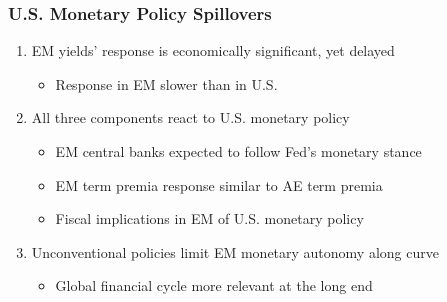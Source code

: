 \documentclass[12pt, aspectratio=169, xcolor=dvipsnames]{beamer}
\title{}
\date{}
\author{Pavel Solís}
\institute{Johns Hopkins University}
\begin{document}
	
\maketitle


\begin{frame}
\frametitle{U.S. Monetary Policy Spillovers}
\begin{enumerate}
	\item EM yields' response is \alert{economically significant}, yet \alert{delayed} %
	\begin{itemize}
		\item Response in EM slower than in U.S.
		\newline
	\end{itemize}
	
	
	\item \alert{All three} components react to U.S. monetary policy %
	\begin{itemize}
		\item EM central banks expected to follow Fed's monetary stance
		\item EM term premia response similar to AE term premia
		\item Fiscal implications in EM of U.S. monetary policy
		\newline
	\end{itemize} 
	
	\item Unconventional policies \alert{limit} EM monetary autonomy along curve %
	\begin{itemize}
		\item Global financial cycle more relevant at the long end
	\end{itemize}
\end{enumerate}
\end{frame}
\end{document}
